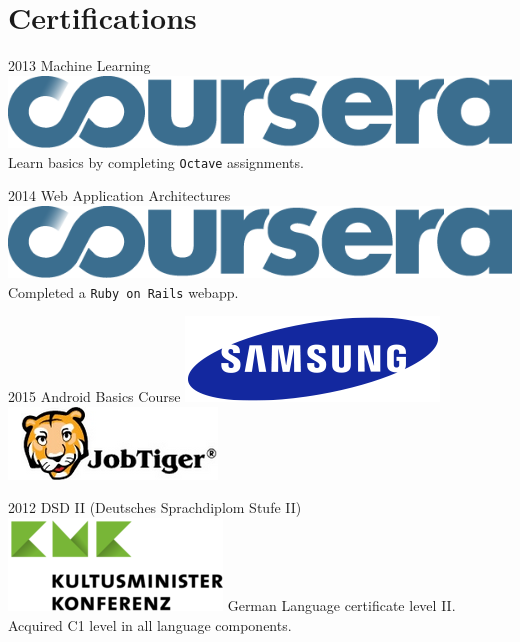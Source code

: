 \documentclass[]{friggeri-cv}
\begin{document}
\section{Certifications}
\begin{entrylist}
    \entry
    {2013}
    {Machine Learning}
    {\includegraphics[scale=0.4]{img/coursera_logo.png}}
    {Learn basics by completing \texttt{Octave} assignments.}
    
    \entry
    {2014}
    {Web Application Architectures}
    {\includegraphics[scale=0.4]{img/coursera_logo.png}}
    {Completed a \texttt{Ruby on Rails} webapp.}
    
    \entry
    {2015}
    {Android Basics Course}
    {\includegraphics[scale=0.1]{img/samsung_logo.png}\includegraphics[scale=0.1]{img/job_tiger_logo.png}}

    \entry
    {2012}
    {DSD II (Deutsches Sprachdiplom Stufe II)}
    {\includegraphics[scale=0.2]{img/kmk_logo.png}}
    {German Language certificate level II. Acquired C1 level in all language components.}
\end{entrylist}
\end{document}
